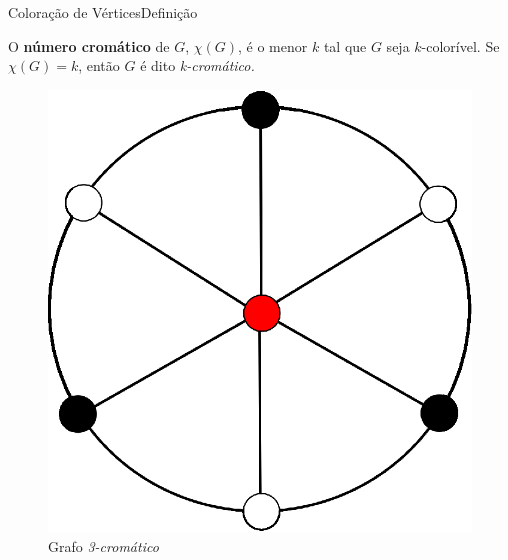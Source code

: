 \documentclass{beamer}
\begin{document}
\begin{frame}{Coloração de Vértices}{Definição}

\begin{outline}
	\1 O \textbf{número cromático}  de $G$, $\chi(G)$, é o menor $k$  tal que $G$ seja $k$-colorível.
    \vskip 0.1cm
    \2 Se $\chi(G)=k$, então $G$ é dito \textit{k-cromático.}
\end{outline}


    \begin{figure}
      \includegraphics[scale=0.5]{3-chromatic-graph.eps}
      \caption{Grafo \textit{3-cromático}}
    \end{figure}


\end{frame}
\end{document}

